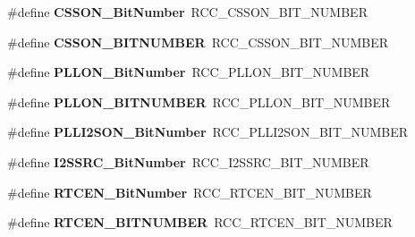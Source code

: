 \begin{DoxyCompactItemize}
\item 
\#define {\bfseries C\+S\+S\+O\+N\+\_\+\+Bit\+Number}~R\+C\+C\+\_\+\+C\+S\+S\+O\+N\+\_\+\+B\+I\+T\+\_\+\+N\+U\+M\+B\+ER\hypertarget{group___h_a_l___r_c_c___aliased_ga253fa44d87aabc55f0cd6628e77a51fd}{}\label{group___h_a_l___r_c_c___aliased_ga253fa44d87aabc55f0cd6628e77a51fd}

\item 
\#define {\bfseries C\+S\+S\+O\+N\+\_\+\+B\+I\+T\+N\+U\+M\+B\+ER}~R\+C\+C\+\_\+\+C\+S\+S\+O\+N\+\_\+\+B\+I\+T\+\_\+\+N\+U\+M\+B\+ER\hypertarget{group___h_a_l___r_c_c___aliased_ga993cf17c844a51d912cf099d4117bd70}{}\label{group___h_a_l___r_c_c___aliased_ga993cf17c844a51d912cf099d4117bd70}

\item 
\#define {\bfseries P\+L\+L\+O\+N\+\_\+\+Bit\+Number}~R\+C\+C\+\_\+\+P\+L\+L\+O\+N\+\_\+\+B\+I\+T\+\_\+\+N\+U\+M\+B\+ER\hypertarget{group___h_a_l___r_c_c___aliased_gab24d7f5f8e4b3b717fd91b54f393f6a3}{}\label{group___h_a_l___r_c_c___aliased_gab24d7f5f8e4b3b717fd91b54f393f6a3}

\item 
\#define {\bfseries P\+L\+L\+O\+N\+\_\+\+B\+I\+T\+N\+U\+M\+B\+ER}~R\+C\+C\+\_\+\+P\+L\+L\+O\+N\+\_\+\+B\+I\+T\+\_\+\+N\+U\+M\+B\+ER\hypertarget{group___h_a_l___r_c_c___aliased_ga1360ce96541cc7c323d3ea4b5b885a64}{}\label{group___h_a_l___r_c_c___aliased_ga1360ce96541cc7c323d3ea4b5b885a64}

\item 
\#define {\bfseries P\+L\+L\+I2\+S\+O\+N\+\_\+\+Bit\+Number}~R\+C\+C\+\_\+\+P\+L\+L\+I2\+S\+O\+N\+\_\+\+B\+I\+T\+\_\+\+N\+U\+M\+B\+ER\hypertarget{group___h_a_l___r_c_c___aliased_gabae59c3e4200523e3aa5b6e10aee8c46}{}\label{group___h_a_l___r_c_c___aliased_gabae59c3e4200523e3aa5b6e10aee8c46}

\item 
\#define {\bfseries I2\+S\+S\+R\+C\+\_\+\+Bit\+Number}~R\+C\+C\+\_\+\+I2\+S\+S\+R\+C\+\_\+\+B\+I\+T\+\_\+\+N\+U\+M\+B\+ER\hypertarget{group___h_a_l___r_c_c___aliased_ga9561d436b438d8f513b754f1934c3e30}{}\label{group___h_a_l___r_c_c___aliased_ga9561d436b438d8f513b754f1934c3e30}

\item 
\#define {\bfseries R\+T\+C\+E\+N\+\_\+\+Bit\+Number}~R\+C\+C\+\_\+\+R\+T\+C\+E\+N\+\_\+\+B\+I\+T\+\_\+\+N\+U\+M\+B\+ER\hypertarget{group___h_a_l___r_c_c___aliased_ga9302c551752124766afc4cee65436405}{}\label{group___h_a_l___r_c_c___aliased_ga9302c551752124766afc4cee65436405}

\item 
\#define {\bfseries R\+T\+C\+E\+N\+\_\+\+B\+I\+T\+N\+U\+M\+B\+ER}~R\+C\+C\+\_\+\+R\+T\+C\+E\+N\+\_\+\+B\+I\+T\+\_\+\+N\+U\+M\+B\+ER\hypertarget{group___h_a_l___r_c_c___aliased_ga58db3c6eeaa150182f32e741e2ad8066}{}\label{group___h_a_l___r_c_c___aliased_ga58db3c6eeaa150182f32e741e2ad8066}


\end{DoxyCompactItemize}
